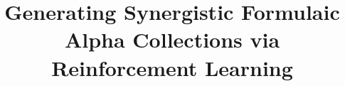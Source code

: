 \documentclass[sigconf]{acmart}
\begin{document}
\title{Generating Synergistic Formulaic Alpha Collections via Reinforcement Learning}





\maketitle










\FloatBarrier


\balance

\appendix




\end{document}
